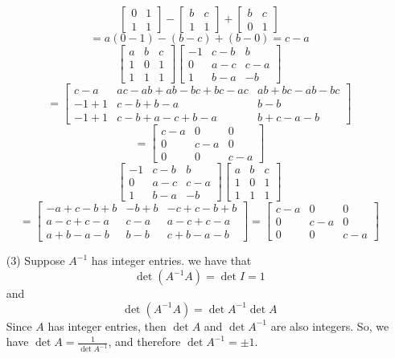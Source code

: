 \documentclass[12pt]{article}
\begin{document}
\begin{itemize}
$$\begin{bmatrix}
0 & 1 \\
1 & 1
\end{bmatrix} - \begin{bmatrix}
b & c \\
1 & 1
\end{bmatrix} + \begin{bmatrix}
b & c \\
0 & 1
\end{bmatrix}$$
$$= a(0 - 1) - (b - c) + (b - 0) = c - a$$
$$\begin{bmatrix}
a & b & c \\
1 & 0 & 1 \\
1 & 1 & 1
\end{bmatrix}\begin{bmatrix}
-1 & c - b & b \\
0 & a - c & c - a \\
1 & b - a & -b
\end{bmatrix}$$
$$= \begin{bmatrix}
c - a & ac - ab + ab - bc + bc - ac & ab + bc  - ab - bc \\
-1 + 1 & c - b + b - a & b - b \\
-1 + 1 & c - b + a - c + b - a & b + c - a - b
\end{bmatrix} $$
$$= \begin{bmatrix}
c - a & 0 & 0 \\
0 & c - a & 0 \\
0 & 0 & c - a
\end{bmatrix}$$
$$\begin{bmatrix}
-1 & c - b & b \\
0 & a - c & c - a \\
1 & b - a & -b
\end{bmatrix}\begin{bmatrix}
a & b & c \\
1 & 0 & 1 \\
1 & 1 & 1
\end{bmatrix}$$
$$= \begin{bmatrix}
-a + c - b + b & -b + b & -c + c - b + b \\
a - c + c - a & c - a & a - c + c - a \\
a + b - a - b & b - b & c + b - a - b
\end{bmatrix} = \begin{bmatrix}
c - a & 0 & 0 \\
0 & c - a & 0 \\
0 & 0 & c - a
\end{bmatrix}$$
\item[(3)]
Suppose $A^{-1}$ has integer entries. we have that
$$\det(A^{-1}A) = \det I = 1$$
and
$$\det(A^{-1}A) = \det A^{-1}\det A$$
Since $A$ has integer entries, then $\det A$ and $\det A^{-1}$ are also integers. So, we have $\det A = \frac{1}{\det A^{-1}}$, and therefore $\det A^{-1} = \pm 1$.


\end{itemize}
\end{document}
